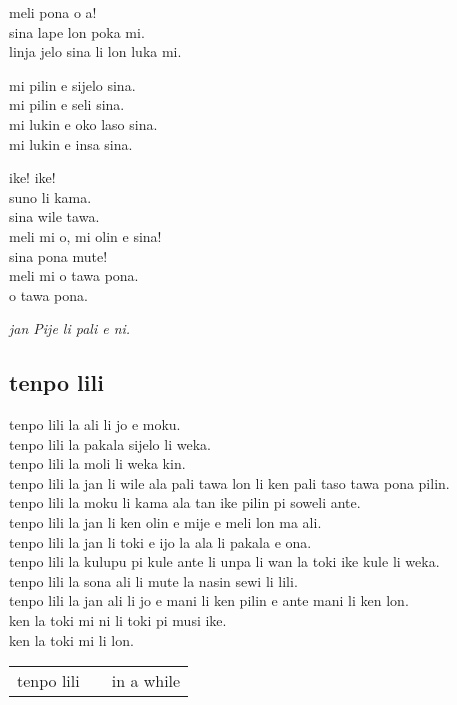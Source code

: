 meli pona o a! \\
sina lape lon poka mi. \\
linja jelo sina li lon luka mi. 

mi pilin e sijelo sina. \\
mi pilin e seli sina. \\
mi lukin e oko laso sina. \\
mi lukin e insa sina. 

ike! ike! \\
suno li kama. \\
sina wile tawa. \\
meli mi o, mi olin e sina! \\
sina pona mute! \\
meli mi o tawa pona. \\
o tawa pona. 

\textit{jan Pije li pali e ni. \cite{www:Pije:01}}
%
\newpage
\subsection{tenpo lili}

tenpo lili la ali li jo e moku.     \\
tenpo lili la pakala sijelo li weka.     \\
tenpo lili la moli li weka kin.     \\
tenpo lili la jan li wile ala pali tawa lon li ken pali taso tawa pona
pilin.     \\
tenpo lili la moku li kama ala tan ike pilin pi soweli ante.     \\
tenpo lili la jan li ken olin e mije e meli lon ma ali.     \\
tenpo lili la jan li toki e ijo la ala li pakala e ona.     \\
tenpo lili la kulupu pi kule ante li unpa li wan la toki ike kule li
weka. \\
tenpo lili la sona ali li mute la nasin sewi li lili.     \\
tenpo lili la jan ali li jo e mani li ken pilin e ante mani li ken lon.     \\
ken la toki mi ni li toki pi musi ike.     \\
ken la toki mi li lon.

\begin{supertabular}{p{5,5cm}|ll}
tenpo lili && in a while \\
\end{supertabular}

